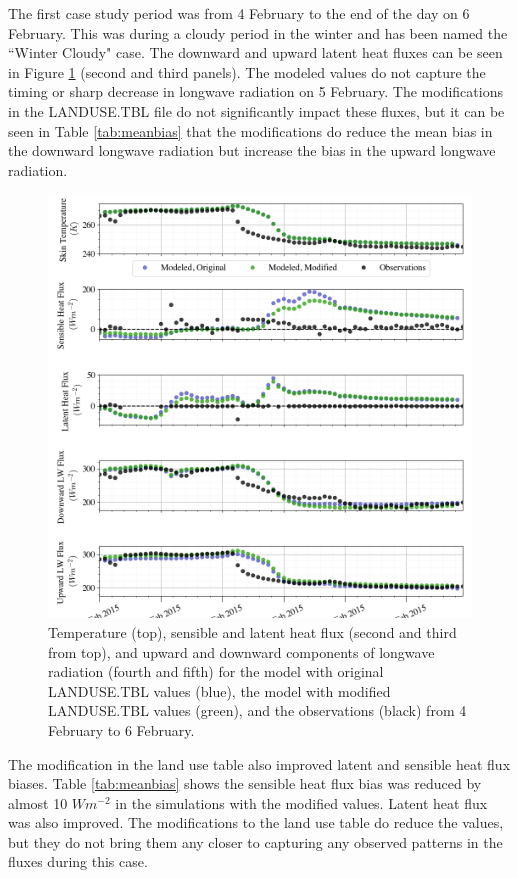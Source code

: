 The first case study period was from 4 February to the end of the day on 6 February. This was during a cloudy period in the winter and has been named the ``Winter Cloudy" case. The downward and upward latent heat fluxes can be seen in Figure \ref{fig:c1} (second and third panels). The modeled values do not capture the timing or sharp decrease in longwave radiation on 5 February. The modifications in the LANDUSE.TBL file do not significantly impact these fluxes, but it can be seen in Table \ref{tab:meanbias} that the modifications do reduce the mean bias in the downward longwave radiation but increase the bias in the upward longwave radiation. 

\begin{figure}[p]
    \centering
    \includegraphics[width=1\linewidth]{figures/chapter6/case1_all_new.png}
    \caption[Idealized Case 1]{Temperature (top), sensible and latent heat flux (second and third from top), and upward and downward components of longwave radiation (fourth and fifth) for the model with original LANDUSE.TBL values (blue), the model with modified LANDUSE.TBL values (green), and the observations (black) from 4 February to 6 February.}
    \label{fig:c1}
\end{figure}

The modification in the land use table also improved latent and sensible heat flux biases. Table \ref{tab:meanbias} shows the sensible heat flux bias was reduced by almost 10 $Wm^{-2}$ in the simulations with the modified values. Latent heat flux was also improved. The modifications to the land use table do reduce the values, but they do not bring them any closer to capturing any observed patterns in the fluxes during this case.

